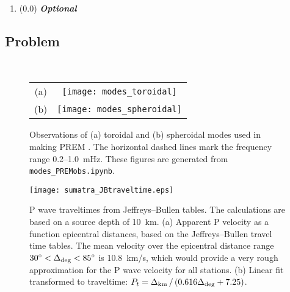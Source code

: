 \documentclass[11pt,titlepage,fleqn]{article}
\begin{document}
\begin{enumerate}
\begin{enumerate}
\item (0.2) Qualitatively describe the variations in the P waves as a function of azimuth from the rupture direction. (Use the waveforms in Figure S11 of \citet{Ammon2005} if your own record section does not match.)
\end{enumerate}


\item (0.0) {\bf\em Optional} 

\end{enumerate}


\subsection*{Problem} \howmuchtime\

\pagebreak


\clearpage\pagebreak


\clearpage\pagebreak
\begin{figure}
\centering
\begin{tabular}{cc}
(a) & \texttt{[image: modes\_toroidal]} \\
(b) & \texttt{[image: modes\_spheroidal]}
\end{tabular}
\caption[]
{{
Observations of (a) toroidal and (b) spheroidal modes used in making PREM \citep{PREM}.
The horizontal dashed lines mark the frequency range 0.2--1.0~mHz.
These figures are generated from {\tt modes\_PREMobs.ipynb}.
}}
\label{fig:premmodes}
\end{figure}

\clearpage\pagebreak
\begin{figure}
\centering
\texttt{[image: sumatra\_JBtraveltime.eps]}
\caption[]
{{
P wave traveltimes from Jeffreys--Bullen tables.
The calculations are based on a source depth of 10~km.
(a) Apparent P velocity as a function epicentral distances, based on the Jeffreys--Bullen travel time tables. 
The mean velocity over the epicentral distance range $30^\circ < \Delta_{\rm deg} < 85^\circ$ is 10.8~km/s, which would provide a very rough approximation for the P wave velocity for all stations.
(b) Linear fit transformed to traveltime: $P_t = \Delta_{\rm km} \,/\, (0.616 \Delta_{\rm deg} + 7.25)$.
}}
\label{fig:JB}
\end{figure}



\end{document}
